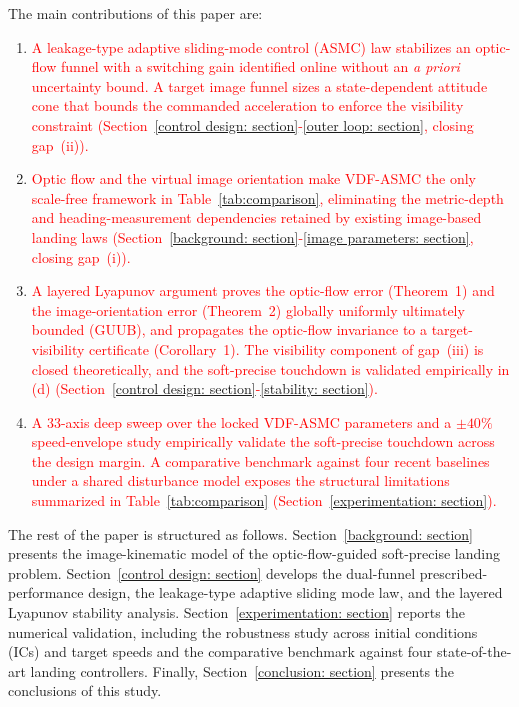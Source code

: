 \documentclass{IEEEtaes}
\newcommand{\new}[1]{\textcolor{red}{#1}}
\begin{document}
The main contributions of this paper are:
\begin{enumerate}
    \item[(a)] \new{A leakage-type adaptive sliding-mode control (ASMC) law stabilizes an optic-flow funnel with a switching gain identified online without an \emph{a priori} uncertainty bound. A target image funnel sizes a state-dependent attitude cone that bounds the commanded acceleration to enforce the visibility constraint (Section~\ref{control design: section}-\ref{outer loop: section}, closing gap~(ii)).}
    \item[(b)] \new{Optic flow and the virtual image orientation make VDF-ASMC the only scale-free framework in Table~\ref{tab:comparison}, eliminating the metric-depth and heading-measurement dependencies retained by existing image-based landing laws (Section~\ref{background: section}-\ref{image parameters: section}, closing gap~(i)).}
    \item[(c)] \new{A layered Lyapunov argument proves the optic-flow error (Theorem~1) and the image-orientation error (Theorem~2) globally uniformly ultimately bounded (GUUB), and propagates the optic-flow invariance to a target-visibility certificate (Corollary~1). The visibility component of gap~(iii) is closed theoretically, and the soft-precise touchdown is validated empirically in (d) (Section~\ref{control design: section}-\ref{stability: section}).}
    \item[(d)] \new{A 33-axis deep sweep over the locked VDF-ASMC parameters and a $\pm 40\%$ speed-envelope study empirically validate the soft-precise touchdown across the design margin. A comparative benchmark against four recent baselines~\cite{lin2022,zhang2026,lin2023,cho2022} under a shared disturbance model exposes the structural limitations summarized in Table~\ref{tab:comparison} (Section~\ref{experimentation: section}).}
\end{enumerate}

The rest of the paper is structured as follows. Section~\ref{background: section} presents the image-kinematic model of the optic-flow-guided soft-precise landing problem. Section~\ref{control design: section} develops the dual-funnel prescribed-performance design, the leakage-type adaptive sliding mode law, and the layered Lyapunov stability analysis. Section~\ref{experimentation: section} reports the numerical validation, including the robustness study across initial conditions (ICs) and target speeds and the comparative benchmark against four state-of-the-art landing controllers. Finally, Section~\ref{conclusion: section} presents the conclusions of this study.
\end{document}
